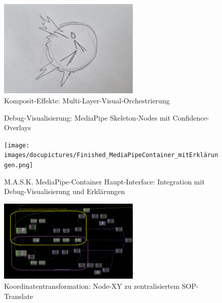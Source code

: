 \begin{figure}[!htbp]
    \centering
    \includegraphics[width=0.6\textwidth,height=0.25\textheight,keepaspectratio]{images/Sprint3_5.jpg}
    \caption{Komposit-Effekte: Multi-Layer-Visual-Orchestrierung}
    \label{fig:composite_effects}
\end{figure}

\begin{figure}[!htbp]
    \centering
    \caption{Debug-Visualisierung: MediaPipe Skeleton-Nodes mit Confidence-Overlays}
    \label{fig:debug_viz}
\end{figure}

\begin{figure}[!htbp]
    \centering
    \texttt{[image: images/docupictures/Finished\_MediaPipeContainer\_mitErklärungen.png]}
    \caption{M.A.S.K. MediaPipe-Container Haupt-Interface: Integration mit Debug-Visualisierung und Erklärungen}
    \label{fig:main_interface}
\end{figure}


\begin{figure}[!htbp]
    \centering
    \includegraphics[width=0.6\textwidth,height=0.25\textheight,keepaspectratio]{images/docupictures/NodeXYzuSOPZentriertemTranslate.png}
    \caption{Koordinatentransformation: Node-XY zu zentralisiertem SOP-Translate}
    \label{fig:coordinate_transformation}
\end{figure}

